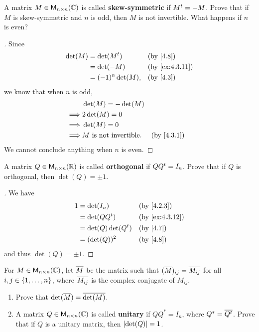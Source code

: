 \begin{ex}\label{ex:4.3.11}
  A matrix \(M \in \mathsf{M}_{{n} \times n}({\mathbb{C}})\) is called \textbf{skew-symmetric} if \({M}^{t} = -M\).
  Prove that if \(M\) is skew-symmetric and \(n\) is odd, then \(M\) is not invertible.
  What happens if \(n\) is even?
\end{ex}

\begin{proof}[]
  Since
  \begin{align*}
    \det(M) & = \det(\tp{M})    &  & \text{(by \cref{4.8})}       \\
            & = \det(-M)        &  & \text{(by \cref{ex:4.3.11})} \\
            & = (-1)^n \det(M), &  & \text{(by \cref{4.3})}
  \end{align*}
  we know that when \(n\) is odd,
  \begin{align*}
             & \det(M) = -\det(M)                                         \\
    \implies & 2 \det(M) = 0                                              \\
    \implies & \det(M) = 0                                                \\
    \implies & M \text{ is not invertible}. &  & \text{(by \cref{4.3.1})}
  \end{align*}
  We cannot conclude anything when \(n\) is even.
\end{proof}

\begin{ex}\label{ex:4.3.12}
  A matrix \(Q \in \mathsf{M}_{{n} \times n}({\mathbb{R}})\) is called \textbf{orthogonal} if \(Q {Q}^{t} = I_n\).
  Prove that if \(Q\) is orthogonal, then \(\det(Q) = \pm 1\).
\end{ex}

\begin{proof}[]
  We have
  \begin{align*}
    1 & = \det(I_n)            &  & \text{(by \cref{4.2.3})}     \\
      & = \det(Q \tp{Q})       &  & \text{(by \cref{ex:4.3.12})} \\
      & = \det(Q) \det(\tp{Q}) &  & \text{(by \cref{4.7})}       \\
      & = (\det(Q))^2          &  & \text{(by \cref{4.8})}
  \end{align*}
  and thus \(\det(Q) = \pm 1\).
\end{proof}

\begin{ex}\label{ex:4.3.13}
  For \(M \in \mathsf{M}_{{n} \times n}({\mathbb{C}})\), let \(\overline{M}\) be the matrix such that \((\overline{M})_{i j} = \overline{M_{i j}}\) for all \(i, j \in \left\lbrace1, \dots, n\right\rbrace\), where \(\overline{M_{i j}}\) is the complex conjugate of \(M_{i j}\).
  \begin{enumerate}
    \item Prove that \(\det(\overline{M}) = \overline{\det(M)}\).
    \item A matrix \(Q \in \mathsf{M}_{{n} \times n}({\mathbb{C}})\) is called \textbf{unitary} if \(Q Q^* = I_n\), where \(Q^* = \overline{{Q}^{t}}\).
          Prove that if \(Q\) is a unitary matrix, then \(\left\lvert\det(Q)\right\rvert = 1\).
  \end{enumerate}
\end{ex}

